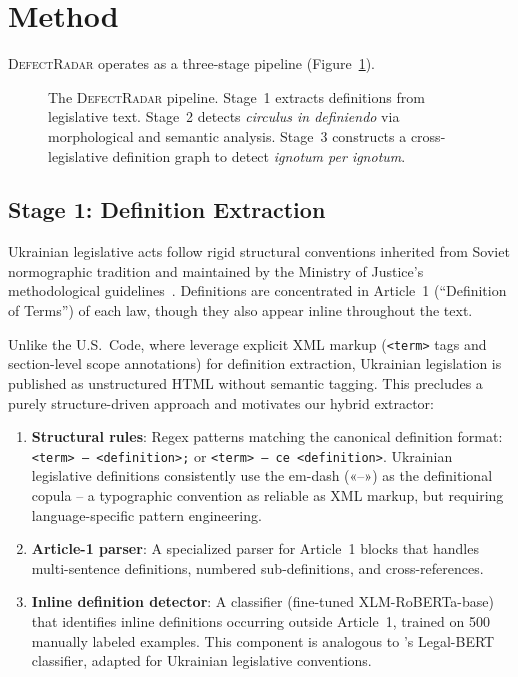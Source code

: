 \documentclass[11pt]{article}
\begin{document}
\section{Method}
\label{sec:method}

\textsc{DefectRadar} operates as a three-stage pipeline (Figure~\ref{fig:pipeline}).

\begin{figure}[t]
\centering

\caption{The \textsc{DefectRadar} pipeline. Stage~1 extracts definitions from legislative text. Stage~2 detects \emph{circulus in definiendo} via morphological and semantic analysis. Stage~3 constructs a cross-legislative definition graph to detect \emph{ignotum per ignotum}.}
\label{fig:pipeline}
\end{figure}

\subsection{Stage 1: Definition Extraction}
\label{sec:extraction}

Ukrainian legislative acts follow rigid structural conventions inherited from Soviet normographic tradition and maintained by the Ministry of Justice's methodological guidelines~\citep{minjust2006guidelines}.
Definitions are concentrated in Article~1 (``Definition of Terms'') of each law, though they also appear inline throughout the text.

Unlike the U.S.\ Code, where \citet{hosabettu2025statutory} leverage explicit XML markup (\texttt{<term>} tags and section-level scope annotations) for definition extraction, Ukrainian legislation is published as unstructured HTML without semantic tagging.
This precludes a purely structure-driven approach and motivates our hybrid extractor:

\begin{enumerate}[nosep,leftmargin=*]
  \item \textbf{Structural rules}: Regex patterns matching the canonical definition format: \texttt{<term> -- <definition>;} or \texttt{<term> -- ce <definition>}. Ukrainian legislative definitions consistently use the em-dash (\foreignlanguage{ukrainian}{«--»}) as the definitional copula -- a typographic convention as reliable as XML markup, but requiring language-specific pattern engineering.
  \item \textbf{Article-1 parser}: A specialized parser for Article~1 blocks that handles multi-sentence definitions, numbered sub-definitions, and cross-references.
  \item \textbf{Inline definition detector}: A classifier (fine-tuned XLM-RoBERTa-base) that identifies inline definitions occurring outside Article~1, trained on 500 manually labeled examples. This component is analogous to \citeauthor{hosabettu2025statutory}'s Legal-BERT classifier, adapted for Ukrainian legislative conventions.
\end{enumerate}
\end{document}
